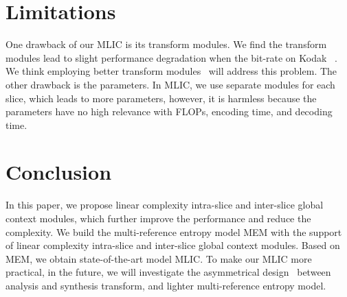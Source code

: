 \documentclass{article}
\theoremstyle{plain}
\theoremstyle{definition}
\theoremstyle{remark}
\begin{document}
  \section{Limitations}
  \label{sec:limit}
  One drawback of our MLIC is its transform modules.
  We find the transform modules lead to slight
  performance degradation when the bit-rate on Kodak~\cite{kodak} .
  We think employing better transform modules~\cite{jiang2023slic,he2022elic,zou2022the,zhu2022transformerbased}
  will address this problem.
  The other drawback is the parameters. In MLIC,
  we use separate modules for each slice, which leads to more parameters, however, it is harmless because the parameters have no
  high relevance with FLOPs, encoding time, and decoding time.
  \section{Conclusion}
  \label{sec:conclusion}
  In this paper, we propose linear complexity intra-slice and inter-slice
  global context modules, which further improve the performance and 
  reduce the complexity.
  We build the multi-reference entropy model MEM with 
  the support of linear complexity intra-slice and inter-slice global
  context modules.
  Based on MEM, we obtain state-of-the-art model MLIC. 
  To make our MLIC more practical,
  in the future, we will investigate the asymmetrical design~\cite{yang2023asymmetrically}
  between analysis and synthesis transform, and lighter multi-reference entropy model.


\nocite{langley00}





\newpage
\appendix
\onecolumn
\end{document}
